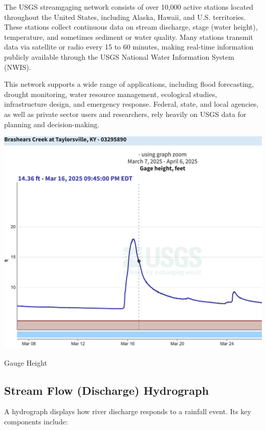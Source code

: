 \documentclass{tufte-handout}\usepackage[]{graphicx}\usepackage[]{xcolor}
\begin{document}
The USGS streamgaging network consists of over 10,000 active stations located throughout the United States, including Alaska, Hawaii, and U.S. territories. These stations collect continuous data on stream discharge, stage (water height), temperature, and sometimes sediment or water quality. Many stations transmit data via satellite or radio every 15 to 60 minutes, making real-time information publicly available through the USGS National Water Information System (NWIS).

This network supports a wide range of applications, including flood forecasting, drought monitoring, water resource management, ecological studies, infrastructure design, and emergency response. Federal, state, and local agencies, as well as private sector users and researchers, rely heavily on USGS data for planning and decision-making.


\begin{marginfigure}
	\centering
		\includegraphics[width=1.00\textwidth]{figure/Gauge_height.png}
		\caption{Gauge Height}
	\label{fig:gauge_ht}
\end{marginfigure}

\subsection{Stream Flow (Discharge) Hydrograph}

A hydrograph displays how river discharge responds to a rainfall event. Its key components include:
\end{document}
